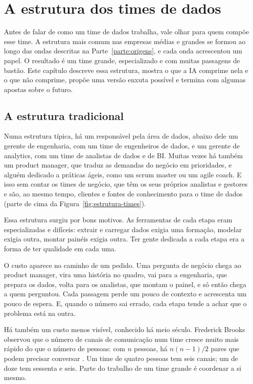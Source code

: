 \chapter{A estrutura dos times de dados}
\label{cap:estrutura-times}

Antes de falar de como um time de dados trabalha, vale olhar para quem compõe esse time. A
estrutura mais comum nas empresas médias e grandes se formou ao longo das ondas descritas na
Parte~\ref{parte:origens}, e cada onda acrescentou um papel. O resultado é um time grande,
especializado e com muitas passagens de bastão. Este capítulo descreve essa estrutura, mostra
o que a IA comprime nela e o que não comprime, propõe uma versão enxuta possível e termina
com algumas apostas sobre o futuro.

\section{A estrutura tradicional}
\label{sec:estrutura-tradicional}

Numa estrutura típica, há um responsável pela área de dados, abaixo dele um gerente de
engenharia, com um time de engenheiros de dados, e um gerente de analytics, com um time de
analistas de dados e de BI. Muitas vezes há também um product manager, que traduz as
demandas do negócio em prioridades, e alguém dedicado a práticas ágeis, como um scrum master
ou um agile coach. E isso sem contar os times de negócio, que têm os seus próprios analistas e
gestores e são, ao mesmo tempo, clientes e fontes de conhecimento para o time de dados
(parte de cima da Figura~\ref{fig:estrutura-times}).

Essa estrutura surgiu por bons motivos. As ferramentas de cada etapa eram especializadas e
difíceis: extrair e carregar dados exigia uma formação, modelar exigia outra, montar painéis
exigia outra. Ter gente dedicada a cada etapa era a forma de ter qualidade em cada uma.

O custo aparece no caminho de um pedido. Uma pergunta de negócio chega ao product manager,
vira uma história no quadro, vai para a engenharia, que prepara os dados, volta para os
analistas, que montam o painel, e só então chega a quem perguntou. Cada passagem perde um
pouco de contexto e acrescenta um pouco de espera. E, quando o número sai errado, cada etapa
tende a achar que o problema está na outra.

Há também um custo menos visível, conhecido há meio século. Frederick Brooks observou que o
número de canais de comunicação num time cresce muito mais rápido do que o número de pessoas:
com $n$ pessoas, há $n(n-1)/2$ pares que podem precisar conversar \parencite{brooks1975}. Um
time de quatro pessoas tem seis canais; um de doze tem sessenta e seis. Parte do trabalho de
um time grande é coordenar a si mesmo.

